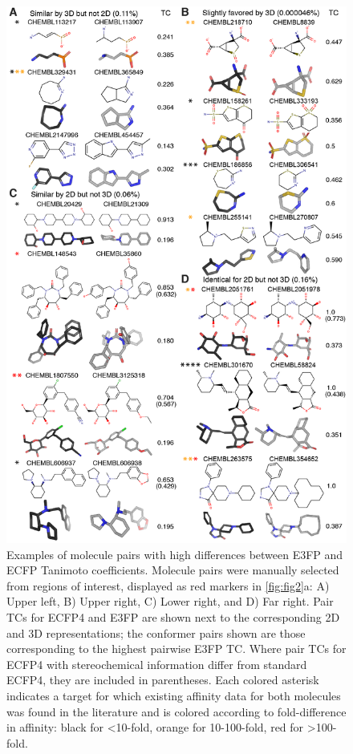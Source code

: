 \documentclass[../../main.tex]{subfiles}
\begin{document}
\begin{refsection}
	\begin{figure}%
		\centering  \includegraphics[width=11.25cm]{fig3.png}
		\caption[Examples of molecule pairs with high differences between E3FP and ECFP Tanimoto coefficients]{
			Examples of molecule pairs with high differences between E3FP and ECFP Tanimoto coefficients.
			Molecule pairs were manually selected from regions of interest, displayed as red markers in  \cref{fig:fig2}a: A) Upper left, B) Upper right, C) Lower right, and D) Far right.
			Pair TCs for ECFP4 and E3FP are shown next to the corresponding 2D and 3D representations; the conformer pairs shown are those corresponding to the highest pairwise E3FP TC.
			Where pair TCs for ECFP4 with stereochemical information differ from standard ECFP4, they are included in parentheses.
			Each colored asterisk indicates a target for which existing affinity data for both molecules was found in the literature and is colored according to fold-difference in affinity: black for \textless{}10-fold, orange for 10-100-fold, red for  \textgreater{}100-fold.}
		\label{fig:fig3}
	\end{figure}


\end{refsection}
\end{document}
